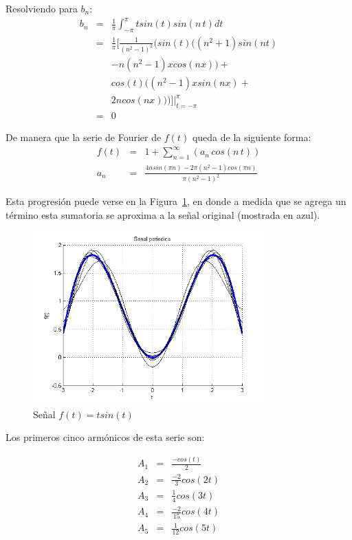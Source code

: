 \documentclass[twocolumn]{article}
\begin{document}
Resolviendo para $b_n$:
\begin{eqnarray*}
b_n &=& \frac{1}{\pi}\int_{-\pi}^{\pi}tsin(t)sin(n\,t)dt\\
&=& \frac{1}{\pi} \bigg[\frac{1}{(n^{2}-1)^{2}}(sin(t)((n^{2}+1)sin(nt) \\
& & -n(n^{2}-1)xcos(nx))+ \\
& & cos(t)((n^{2}-1)xsin(nx) + \\
& &2ncos(nx)))\bigg]\bigg|_{t=-\pi}^{\pi}\\
&=& 0
\end{eqnarray*}

De manera que la serie de Fourier de $f(t)$ queda de la siguiente forma:
\begin{eqnarray*}
f(t) &=& 1 + \sum_{n=1}^\infty\left(a_n\,cos(n\,t)\right)\\
a_n &=& \frac{4nsin(\pi n)-2\pi(n^{2}-1)cos(\pi n)}{\pi(n^{2}- 1)^{2}}
\end{eqnarray*}

Esta progresión puede verse en la Figura~\ref{fig_1b}, en donde a medida que se agrega un término esta sumatoria se aproxima a la señal original (mostrada en azul).

\begin{figure}[!t]
\centering
\includegraphics[width=3.5in]{imgs/tsint.png}
\caption{Señal $f(t) = tsin(t)$}
\label{fig_1b}
\end{figure}

Los primeros cinco armónicos de esta serie son:

\begin{eqnarray*}
A_1 &=& \frac{-cos(t)}{2} \\
A_2 &=& \frac{-2}{3} cos(2t) \\
A_3 &=& \frac{1}{4} cos(3t) \\
A_4 &=& \frac{-2}{15} cos(4t) \\
A_5 &=& \frac{1}{12} cos(5t)
\end{eqnarray*}
\end{document}
